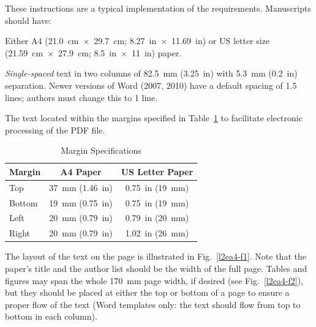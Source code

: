 \documentclass[a4paper]{jacow}
\begin{document}
These instructions are a typical implementation of the
requirements. Manuscripts should have:
\begin{Itemize}
    \item  Either A4 (\SI{21.0}{cm}~$\times$~\SI{29.7}{cm}; \SI{8.27}{in}~$\times$~\SI{11.69}{in}) or US
           letter size (\SI{21.59}{cm}~$\times$~\SI{27.9}{cm}; \SI{8.5}{in}~$\times$~\SI{11}{in}) paper.
    \item  \textit{Single-spaced} text in two columns of \SI{82.5}{mm} (\SI{3.25}{in}) with \SI{5.3}{mm}
           (\SI{0.2}{in}) separation. Newer versions of Word (2007, 2010) have a default spacing
           of 1.5 lines; authors must change this to 1 line.
    \item  The text located within the margins specified in Table~\ref{l2ea4-t1}
           to facilitate electronic processing of the PDF file.
\end{Itemize}
\begin{table}[hbt]
   \centering
   \caption{Margin Specifications}
   \begin{tabular}{lcc}
       \toprule
       \textbf{Margin} & \textbf{A4 Paper}                      & \textbf{US Letter Paper} \\
       \midrule
           Top         & \SI{37}{mm} (\SI{1.46}{in})            & \SI{0.75}{in} (\SI{19}{mm})        \\
          Bottom       & \SI{19}{mm} (\SI{0.75}{in})            & \SI{0.75}{in} (\SI{19}{mm})        \\
           Left        & \SI{20}{mm} (\SI{0.79}{in})            & \SI{0.79}{in} (\SI{20}{mm})        \\
           Right       & \SI{20}{mm} (\SI{0.79}{in})            & \SI{1.02}{in} (\SI{26}{mm})        \\
       \bottomrule
   \end{tabular}
   \label{l2ea4-t1}
\end{table}

The layout of the text on the page is illustrated in
Fig.~\ref{l2ea4-f1}. Note that the paper's title and the author list should be
the width of the full page. Tables and figures may span the whole \SI{170}{mm} page width,
if desired (see Fig.~\ref{l2ea4-f2}), but they should be placed at
either the top or bottom of a page to ensure a proper flow of the text
(Word templates only: the text should flow from top to bottom in each column).
\end{document}
